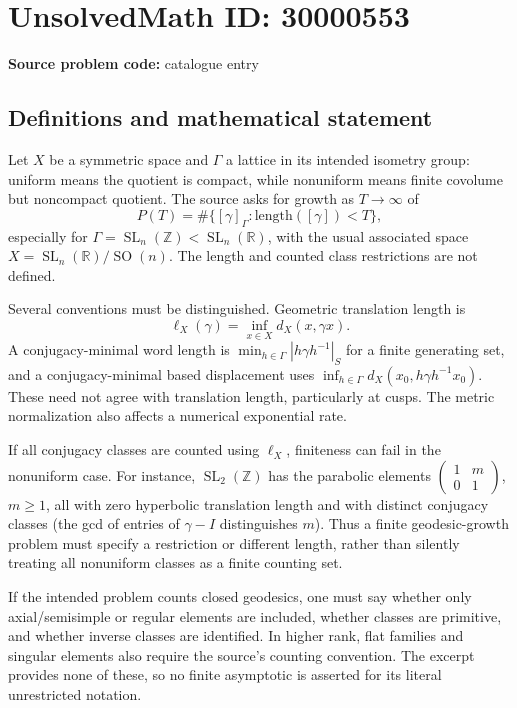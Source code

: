 \documentclass[11pt]{article}
\newcommand{\Z}{\mathbb{Z}}
\newcommand{\R}{\mathbb{R}}
\begin{document}
\section*{UnsolvedMath ID: 30000553}
\textbf{Source problem code:} catalogue entry
\subsection{Definitions and mathematical statement}
Let $X$ be a symmetric space and $\Gamma$ a lattice in its intended isometry group: uniform means the quotient is compact, while nonuniform means finite covolume but noncompact quotient. The source asks for growth as $T\to\infty$ of
\[
 P(T)=\#\{[\gamma]_\Gamma:\text{length}([\gamma])<T\},
\]
especially for $\Gamma=\operatorname{SL}_n(\Z)<\operatorname{SL}_n(\R)$, with the usual associated space $X=\operatorname{SL}_n(\R)/\operatorname{SO}(n)$. The length and counted class restrictions are not defined.

Several conventions must be distinguished. Geometric translation length is
\[
 \ell_X(\gamma)=\inf_{x\in X}d_X(x,\gamma x).
\]
A conjugacy-minimal word length is $\min_{h\in\Gamma}|h\gamma h^{-1}|_S$ for a finite generating set, and a conjugacy-minimal based displacement uses $\inf_{h\in\Gamma}d_X(x_0,h\gamma h^{-1}x_0)$. These need not agree with translation length, particularly at cusps. The metric normalization also affects a numerical exponential rate.

If all conjugacy classes are counted using $\ell_X$, finiteness can fail in the nonuniform case. For instance, $\operatorname{SL}_2(\Z)$ has the parabolic elements $\begin{pmatrix}1&m\\0&1\end{pmatrix}$, $m\geq1$, all with zero hyperbolic translation length and with distinct conjugacy classes (the gcd of entries of $\gamma-I$ distinguishes $m$). Thus a finite geodesic-growth problem must specify a restriction or different length, rather than silently treating all nonuniform classes as a finite counting set.

If the intended problem counts closed geodesics, one must say whether only axial/semisimple or regular elements are included, whether classes are primitive, and whether inverse classes are identified. In higher rank, flat families and singular elements also require the source's counting convention. The excerpt provides none of these, so no finite asymptotic is asserted for its literal unrestricted notation.
\end{document}
